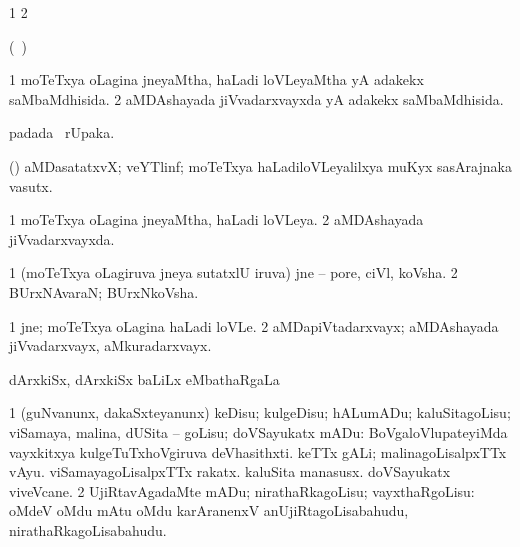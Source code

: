 {{{{{{{{{{{\noindent 
\gl{\pagu}
\expl{}
\bmng
\bnum
\num{1} 
\num{2} 
\enum
\emng
\eentry

\bentry
{}
\gl{\nA}
\expl{}
\bmng
 (\kanmu\ \ame)  
\emng
\eentry

\bentry
{} 
\gl{\gu}
\expl{}
\bmng
\bnum
\num{1} moTeTxya oLagina jneyaMtha, haLadi loVLeyaMtha yA adakekx saMbaMdhisida. 
\num{2} aMDAshayada jiVvadarxvayxda yA adakekx saMbaMdhisida. 
\enum
\emng
\eentry

\bentry 
{} 
\gl{\nA}
\expl{}
\bmng
  padada \bava\ rUpaka. 
\emng
\eentry

\bentry
{} 
\gl{\nA}
\expl{}
\bmng
 (\ravi) aMDasatatxvX; veYTlinf; moTeTxya haLadiloVLeyalilxya muKyx sasArajnaka vasutx. 
\emng
\eentry

\bentry
{} 
\gl{\gu}
\expl{}
\bmng
\bnum
\num{1} moTeTxya oLagina jneyaMtha, haLadi loVLeya. 
\num{2} aMDAshayada jiVvadarxvayxda. 
\enum
\emng
\eentry

\bentry
{}
\gl{\nA}
\expl{}
\bmng
\bnum
\num{1} (moTeTxya oLagiruva jneya sutatxlU iruva) jne -- pore, ciVl, koVsha. 
\num{2} BUrxNAvaraN; BUrxNkoVsha. 
\enum
\emng
\eentry

\bentry
{} 
\gl{\nA}
\bmng
\bnum
\num{1} jne; moTeTxya oLagina haLadi loVLe. 
\num{2} aMDapiVtadarxvayx; aMDAshayada jiVvadarxvayx, aMkuradarxvayx. 
\enum
\emng
\eentry

\bentry 
{} 
\gl{\sapUpa}
\expl{}
\bmng
 dArxkiSx, dArxkiSx baLiLx eMbathaRgaLa \sapUpa 
\emng
\eentry

\bentry 
{} 
\gl{\sakirx}
\expl{}
\bmng
\bnum
\num{1} (guNvanunx, dakaSxteyanunx) keDisu; kulgeDisu; hALumADu; kaluSitagoLisu; viSamaya, malina, dUSita -- goLisu; doVSayukatx mADu:  BoVgaloVlupateyiMda vayxkitxya kulgeTuTxhoVgiruva deVhasithxti.  keTTx gALi; malinagoLisalpxTTx vAyu.  viSamayagoLisalpxTTx rakatx.  kaluSita manasusx.  doVSayukatx viveVcane. 
\num{2} UjiRtavAgadaMte mADu; nirathaRkagoLisu; vayxthaRgoLisu:  oMdeV oMdu mAtu oMdu karAranenxV anUjiRtagoLisabahudu, nirathaRkagoLisabahudu. 
\enum
\emng
\eentry

}}}}}}}}}}}
